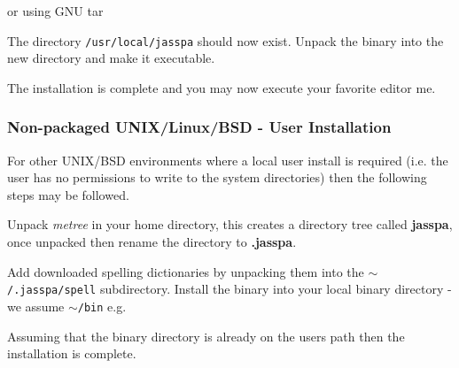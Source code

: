 \documentclass[11pt,a4paper,pdftex]{article}
\begin{document}

    or using GNU tar


  The directory \texttt{/usr/local/jasspa} should now exist. Unpack the binary
  into the new directory and make it executable.


  The installation is complete and you may now execute your favorite editor
  me.

\subsubsection{Non-packaged UNIX/Linux/BSD - User Installation}

  For other UNIX/BSD environments where a local user install is required (i.e.
  the user has no permissions to write to the system directories) then the
  following steps may be followed.

  Unpack \textit{metree} in your home directory, this creates a directory tree
  called \textbf{jasspa}, once unpacked then rename the directory to
  \textbf{.jasspa}.


  Add downloaded spelling dictionaries by unpacking them into the
  \texttt{$\sim$/.jasspa/spell} subdirectory. Install the binary into your local
  binary directory - we assume \texttt{$\sim$/bin} e.g.


  Assuming that the binary directory is already on the users path then the
  installation is complete.
\end{document}
